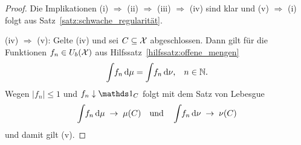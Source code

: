 \documentclass[../thesis/thesis.tex]{subfiles}
\begin{document}
	\begin{proof}
		Die Implikationen (i) $\Rightarrow$ (ii) $\Rightarrow$ (iii) $\Rightarrow$ (iv) sind klar und (v) 
		$\Rightarrow$ (i) folgt aus Satz~\ref{satz:schwache_regularität}.
		
		(iv) $\Rightarrow$ (v): Gelte (iv) und sei $C \subseteq \mathcal{X}$ abgeschlossen. 
		Dann gilt für die Funktionen $f_n \in U_b(\mathcal{X})$ aus Hilfssatz~\ref{hilfssatz:offene_mengen}
		$$\int_{} \, f_n \, \mathrm{d}\mu = \int_{} \, f_n \, \mathrm{d}\nu\text{,} \quad n \in \mathbb{N} \text{.}$$
		Wegen $| f_n | \leq 1$ und $f_n \convdown \indfct_C$ folgt mit dem Satz von Lebesgue 
		$$\int_{} \, f_n \, \mathrm{d}\mu \; \to \; \mu(C) \quad \text{und} \quad \int_{} \, f_n \, \mathrm{d}\nu 
		\; \to \; \nu(C)$$
		und damit gilt (v).
	\end{proof}
	
\end{document}
